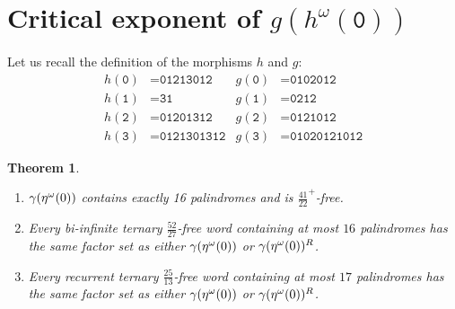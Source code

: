 \documentclass[10pt,a4paper]{amsart}
\newtheorem{theorem}{Theorem}
\newcommand{\normaltt}[1]{\normalfont\texttt{#1}}
\begin{document}


\section{Critical exponent of \texorpdfstring{$g(h^{\omega}({\texttt 0}))$}{g(h omega(0))}}\label{sec:ce}
Let us recall the definition of the morphisms $h$ and $g$:
\begin{align*}
    h(\texttt{0}) &= \texttt{01213012} & g(\texttt{0}) &= \texttt{0102012}\\
    h(\texttt{1}) &= \texttt{31} & g(\texttt{1}) &= \texttt{0212}\\
    h(\texttt{2}) &= \texttt{01201312} & g(\texttt{2}) &= \texttt{0121012}\\
    h(\texttt{3}) &= \texttt{0121301312} & g(\texttt{3}) &= \texttt{01020121012}
\end{align*}

\begin{theorem}\label{41_22}{\ }
\begin{enumerate}[label=\normalfont(\alph*)]
\item $\gamma(\eta^\omega(\normaltt{0}))$ contains exactly 16 palindromes and is $\tfrac{41}{22}^+$-free.\label{it:16p}
\item Every bi-infinite ternary $\tfrac{52}{27}$-free word containing at most $16$ palindromes has the same factor set as either $\gamma(\eta^\omega(\normaltt{0}))$ or $\gamma(\eta^\omega(\normaltt{0}))^R$.\label{it:pos}
\item Every recurrent ternary $\tfrac{25}{13}$-free word containing at most $17$ palindromes has the same factor set as either $\gamma(\eta^\omega(\normaltt{0}))$ or $\gamma(\eta^\omega(\normaltt{0}))^R$.\label{it:neg}
\end{enumerate}
\end{theorem}
\end{document}
